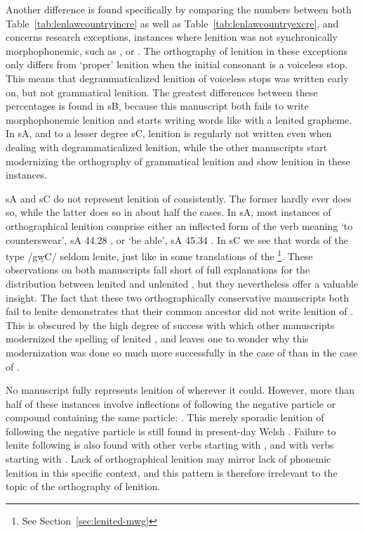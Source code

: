Another difference is found specifically by comparing the numbers between both Table~\ref{tab:lenlawcountryincre} as well as Table~\ref{tab:lenlawcountryexcre}, and concerns research exceptions, \ie instances where lenition was not synchronically morphophonemic, such as , or . The orthography of lenition in these exceptions only differs from `proper' lenition when the initial consonant is a voiceless stop. This means that degrammaticalized lenition of voiceless stops was written early on, but not grammatical lenition. The greatest differences between these percentages is found in \gls{sB}, because this manuscript both fails to write morphophonemic lenition and starts writing words like  with a lenited grapheme. In \gls{sA}, and to a lesser degree \gls{sC}, lenition is regularly not written even when dealing with degrammaticalized lenition, while the other manuscripts start modernizing the orthography of grammatical lenition and show lenition in these instances.

\Gls{sA} and \gls{sC} do not represent lenition of  consistently. The former hardly ever does so, while the latter does so in about half the cases. In \gls{sA}, most instances of orthographical lenition comprise either an inflected form of the verb meaning `to counterswear', \eg \gls{sA} 44.28 , or `be able', \eg \gls{sA} 45.34 . In \gls{sC} we see that words of the type /gw̯\gls{C}/ seldom lenite, just like in some translations of the \footnote{See Section~\ref{sec:lenited-mwg}}. These observations on both manuscripts fall short of full explanations for the distribution between lenited and unlenited , but they nevertheless offer a valuable insight. The fact that these two orthographically conservative manuscripts both fail to lenite  demonstrates that their common ancestor did not write lenition of . This is obscured by the high degree of success with which other manuscripts modernized the spelling of lenited , and leaves one to wonder why this modernization was done so much more successfully in the case of  than in the case of .

No manuscript fully represents lenition of  wherever it could. However, more than half of these instances involve inflections of  following the negative particle  or compound containing the same particle: . This merely sporadic lenition of  following the negative particle is still found in present-day Welsh \autocite[695]{thomas_gramadeg_1996}. Failure to lenite following  is also found with other verbs starting with , and with verbs starting with . Lack of orthographical lenition may mirror lack of phonemic lenition in this specific context, and this pattern is therefore irrelevant to the topic of the orthography of lenition. 

